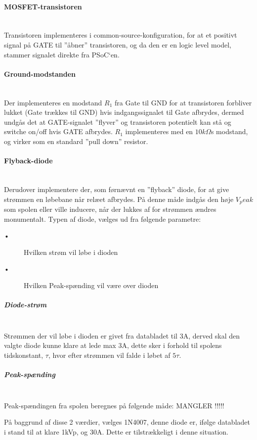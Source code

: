 \paragraph{MOSFET-transistoren} \hspace{0pt} \\
Transistoren implementeres i common-source-konfiguration, for at et positivt signal på GATE til ”åbner” transistoren, og da den er en logic level
model, stammer signalet direkte fra PSoC`en. 

\paragraph{Ground-modstanden} \hspace{0pt} \\
Der implementeres en modstand $R_1$ fra Gate til GND for at transistoren forbliver lukket (Gate trækkes til GND) hvis indgangssignalet til Gate afbrydes, dermed undgås det at GATE-signalet ”flyver” og transistoren potentielt kan stå og switche on/off hvis GATE afbrydes. $R_1$ implementeres med en $10k\Omega$s modstand, og virker som en standard ”pull down” resistor.

\paragraph{Flyback-diode} \hspace{0pt} \\
Derudover implementere der, som førnævnt en ”flyback” diode, for at give strømmen en løbebane når relæet afbrydes. På denne måde indgås den høje $V_peak$ som spolen eller ville inducere, når der lukkes af for strømmen ændres monumentalt. Typen af diode, vælges ud fra følgende parametre:


\begin{description}
 \item[•] Hvilken strøm vil løbe i dioden
 \item[•] Hvilken Peak-spænding vil være over dioden
\end{description}

\subparagraph{Diode-strøm} \hspace{0pt} \\
Strømmen der vil løbe i dioden er givet fra databladet til  3A, derved skal den valgte diode kunne klare at lede max 3A, dette sker i forhold til spolens tidskonstant, $\tau$, hvor efter strømmen vil falde i løbet af $ 5 \tau$.

\subparagraph{Peak-spænding} \hspace{0pt} \\
Peak-spændingen fra spolen beregnes på følgende måde: MANGLER !!!!!

På baggrund af disse 2 værdier, vælges 1N4007, denne diode er, ifølge databladet i stand til at klare 1kVp, og 30A. Dette er tilstrækkeligt i denne situation.